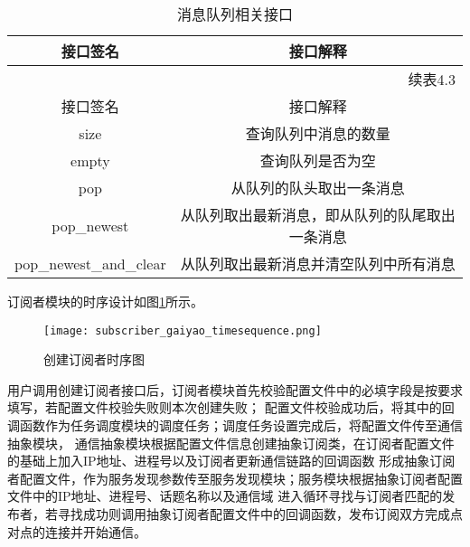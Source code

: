 \begin{longtable}{cc}
  \caption{消息队列相关接口}\label{tab1}\\
  \toprule
  接口签名 & 接口解释 \\
  \midrule
  \endfirsthead
  \multicolumn{2}{r}{续表4.3}\\
  \toprule
  接口签名 & 接口解释 \\
  \hline
  \endhead
  \endfoot
  \bottomrule
  \endlastfoot

  size & 查询队列中消息的数量\\
  empty & 查询队列是否为空\\
  pop & 从队列的队头取出一条消息\\
  pop\_newest & 从队列取出最新消息，即从队列的队尾取出一条消息\\
  pop\_newest\_and\_clear & 从队列取出最新消息并清空队列中所有消息\\
  \end{longtable}  

订阅者模块的时序设计如图\ref{subscriber_gaiyao_timesequence}所示。
\begin{figure}[H]
  \centering
  \texttt{[image: subscriber\_gaiyao\_timesequence.png]}
  \caption{创建订阅者时序图}
  \label{subscriber_gaiyao_timesequence}
\end{figure}
用户调用创建订阅者接口后，订阅者模块首先校验配置文件中的必填字段是按要求填写，若配置文件校验失败则本次创建失败；
配置文件校验成功后，将其中的回调函数作为任务调度模块的调度任务；调度任务设置完成后，将配置文件传至通信抽象模块，
通信抽象模块根据配置文件信息创建抽象订阅类，在订阅者配置文件的基础上加入IP地址、进程号以及订阅者更新通信链路的回调函数
形成抽象订阅者配置文件，作为服务发现参数传至服务发现模块；服务模块根据抽象订阅者配置文件中的IP地址、进程号、话题名称以及通信域
进入循环寻找与订阅者匹配的发布者，若寻找成功则调用抽象订阅者配置文件中的回调函数，发布订阅双方完成点对点的连接并开始通信。

